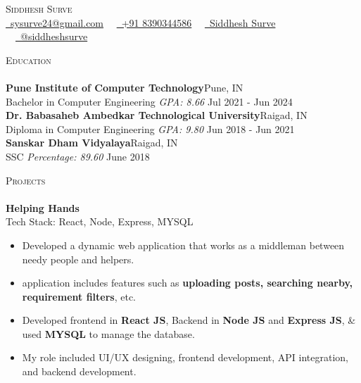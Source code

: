 \documentclass[a4paper]{article}
\newcommand{\lineunder} {
    \vspace*{-8pt} \\
    \hspace*{-18pt} \hrulefill \\
}
\newcommand{\header} [1] {
    {\hspace*{-18pt}\vspace*{6pt} \textsc{#1}}
    \vspace*{-6pt} \lineunder
}
\begin{document}
\vspace*{-40pt}

    

\vspace*{-10pt}
\begin{center}
	{\Huge \scshape {Siddhesh Surve}}\\
	\vspace{2mm}
	  \href{mailto:paritpranav@gmail.com}{\faEnvelope \ sysurve24@gmail.com} \ \
	  \href{tel:+917058613042}{\faPhone \ +91 8390344586} \ \ \href{https://www.linkedin.com/in/siddheshsurve83/}{\faLinkedin \ Siddhesh Surve} \ \
	  \href{https://github.com/siddheshsurve}{\faGithub \ @siddheshsurve} \\
\end{center}

\header{Education}
\vspace{2mm}
\textbf{Pune Institute of Computer Technology}\hfill Pune, IN\\
Bachelor in Computer Engineering \textit{GPA: 8.66} \hfill Jul 2021 - Jun 2024\\
\vspace{3mm}
\textbf{Dr. Babasaheb Ambedkar Technological University}\hfill Raigad, IN\\
Diploma in Computer Engineering \textit{GPA: 9.80} \hfill Jun 2018 - Jun 2021\\
\vspace{3mm}
\textbf{Sanskar Dham Vidyalaya}\hfill Raigad, IN\\
SSC \textit{Percentage: 89.60} \hfill June 2018\\
\vspace{3mm}

\header{Projects}
\vspace{2mm}
{\textbf{Helping Hands}}\hfill 
\href{https://github.com/Org-Helping-Hands}{\faGithub}\\
\vspace{1mm}
Tech Stack: React, Node, Express, MYSQL
\vspace{-1mm}
\begin{itemize} \itemsep 0.5pt
    \item Developed a dynamic web application that works as a middleman between needy people and helpers.
    \item application includes features such as \textbf{uploading posts, searching nearby, requirement filters}, etc.
    \item Developed frontend in \textbf{React JS}, Backend in \textbf{Node JS} and \textbf{Express JS}, \& used \textbf{MYSQL} to manage the database. 
    \item My role included UI/UX designing, frontend development, API integration, and backend development.
\end{itemize}
\vspace{2mm}
\end{document}
